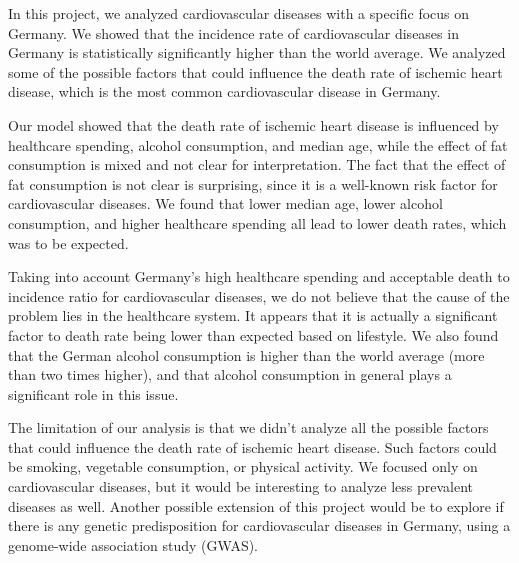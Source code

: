 
In this project, we analyzed cardiovascular diseases with a specific focus on Germany.
We showed that the incidence rate of cardiovascular diseases in Germany is statistically significantly higher than the world average.
We analyzed some of the possible factors that could influence the death rate of ischemic heart disease, which is the most common cardiovascular disease in Germany.


Our model showed that the death rate of ischemic heart disease is influenced by healthcare spending, alcohol consumption, and median age, while 
the effect of fat consumption is mixed and not clear for interpretation. The fact that the effect of fat consumption is not clear is surprising, since it is 
a well-known risk factor for cardiovascular diseases.
We found that lower median age, lower alcohol consumption, and higher healthcare spending
all lead to lower death rates, which was to be expected.


Taking into account Germany's high healthcare spending and acceptable death to incidence ratio for cardiovascular diseases, we do not believe that the cause of the problem lies in the healthcare system.
It appears that it is actually a significant factor to death rate being lower than expected based on lifestyle.
We also found that the German alcohol consumption is higher than the world average (more than two times higher), and that alcohol consumption
in general plays a significant role in this issue. 


The limitation of our analysis is that we didn't analyze all the possible factors that could influence the death rate of ischemic heart disease. 
Such factors could be smoking, vegetable consumption, or physical activity. We focused only on cardiovascular diseases, but it would be interesting to analyze less prevalent diseases as well.
Another possible extension of this project would be to explore if there is any genetic predisposition for cardiovascular diseases in Germany, using a genome-wide association study (GWAS).